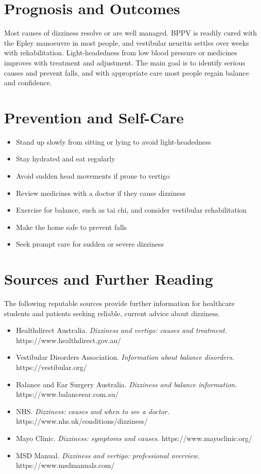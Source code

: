 \section*{Prognosis and Outcomes}
Most causes of dizziness resolve or are well managed. BPPV is readily cured with the Epley manoeuvre in most people, and vestibular neuritis settles over weeks with rehabilitation. Light-headedness from low blood pressure or medicines improves with treatment and adjustment. The main goal is to identify serious causes and prevent falls, and with appropriate care most people regain balance and confidence.

\section*{Prevention and Self-Care}
\begin{itemize}
    \item Stand up slowly from sitting or lying to avoid light-headedness
    \item Stay hydrated and eat regularly
    \item Avoid sudden head movements if prone to vertigo
    \item Review medicines with a doctor if they cause dizziness
    \item Exercise for balance, such as tai chi, and consider vestibular rehabilitation
    \item Make the home safe to prevent falls
    \item Seek prompt care for sudden or severe dizziness
\end{itemize}

\section*{Sources and Further Reading}
The following reputable sources provide further information for healthcare students and patients seeking reliable, current advice about dizziness.

\begin{itemize}
    \item Healthdirect Australia. \textit{Dizziness and vertigo: causes and treatment.} https://www.healthdirect.gov.au/
    \item Vestibular Disorders Association. \textit{Information about balance disorders.} https://vestibular.org/
    \item Balance and Ear Surgery Australia. \textit{Dizziness and balance information.} https://www.balanceear.com.au/
    \item NHS. \textit{Dizziness: causes and when to see a doctor.} https://www.nhs.uk/conditions/dizziness/
    \item Mayo Clinic. \textit{Dizziness: symptoms and causes.} https://www.mayoclinic.org/
    \item MSD Manual. \textit{Dizziness and vertigo: professional overview.} https://www.msdmanuals.com/
\end{itemize}
